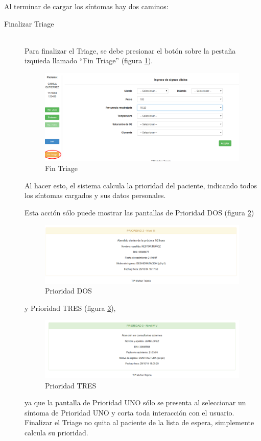 Al terminar de cargar los síntomas hay dos caminos:
\begin{description}
\item[Finalizar Triage]  \mbox{} \\
Para finalizar el Triage, se debe presionar el botón sobre la pestaña izquieda llamado ``Fin Triage'' (figura \ref{fig:fin_triage}).
\begin{figure}
\centerline{\includegraphics[width=0.99\textwidth]{fin_triage.png}}
\caption{Fin Triage} \label{fig:fin_triage}
\end{figure}
 Al hacer esto, el sistema calcula la prioridad del paciente, indicando todos los síntomas cargados y sus datos personales. 

Esta acción sólo puede mostrar las pantallas de Prioridad DOS (figura \ref{fig:prioridad_dos}) 
\begin{figure}
\centerline{\includegraphics[width=0.99\textwidth]{prioridad_dos.png}}
\caption{Prioridad DOS} \label{fig:prioridad_dos}
\end{figure}
y Prioridad TRES (figura \ref{fig:prioridad_tres}), 
\begin{figure}
\centerline{\includegraphics[width=0.99\textwidth]{prioridad_tres.png}}
\caption{Prioridad TRES} \label{fig:prioridad_tres}
\end{figure}
ya que la pantalla de Prioridad UNO sólo se presenta al seleccionar un síntoma de Prioridad UNO y corta toda interacción con el usuario.
Finalizar el Triage no quita al paciente de la lista de espera, simplemente calcula su prioridad. 


\end{description}
